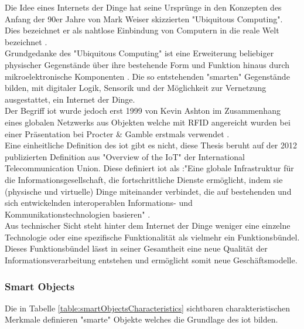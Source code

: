 \documentclass[a4paper, 12pt, twoside, headsepline=true]{scrartcl} %
\begin{document}
Die Idee eines Internets der Dinge hat seine Ursprünge in den Konzepten des Anfang der 90er Jahre von Mark Weiser skizzierten "Ubiquitous Computing". Dies bezeichnet er als nahtlose Einbindung von Computern in die reale Welt bezeichnet \cite{ucweiser}. \\
Grundgedanke des "Ubiquitous Computing" ist eine Erweiterung beliebiger physischer Gegenstände über ihre bestehende Form und Funktion hinaus durch mikroelektronische Komponenten \cite{237456}. Die so entstehenden "smarten" Gegenstände bilden, mit digitaler Logik, Sensorik und der Möglichkeit zur Vernetzung ausgestattet, ein Internet der Dinge.\\
 Der Begriff \acl{iot} wurde jedoch erst 1999 von Kevin Ashton im Zusammenhang eines globalen Netzwerks aus Objekten welche mit RFID angereicht wurden bei einer Präsentation bei Procter \& Gamble erstmals verwendet \cite{rfidiot}. \\
 Eine einheitliche Definition des \ac{iot} gibt es nicht, diese Thesis beruht auf der 2012 publizierten Definition aus "Overview of the IoT" der International Telecommunication Union. Diese definiert \ac{iot} als :"Eine globale Infrastruktur für die Informationsgesellschaft, die fortschrittliche Dienste ermöglicht, indem sie (physische und virtuelle) Dinge miteinander verbindet, die auf bestehenden und sich entwickelnden interoperablen Informations- und Kommunikationstechnologien basieren" \cite{iotdefinition}. \\
Aus technischer Sicht steht hinter dem Internet der Dinge weniger eine einzelne Technologie oder eine spezifische Funktionalität als vielmehr ein Funktionsbündel. Dieses Funktionsbündel lässt in seiner Gesamtheit eine neue Qualität der Informationsverarbeitung entstehen und ermöglicht somit neue Geschäftsmodelle.

\subsubsection{Smart Objects}
 Die in Tabelle \ref{table:smartObjectsCharacteristics} sichtbaren charakteristischen Merkmale definieren "smarte" Objekte welches die Grundlage des \ac{iot} bilden.
\end{document}
